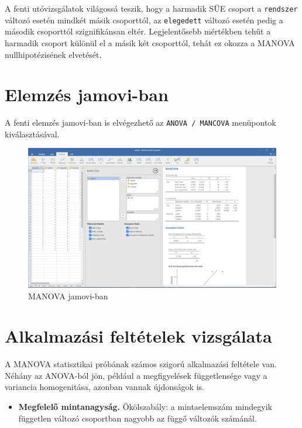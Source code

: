 \documentclass[
  letterpaper,
]{krantz}
\providecommand{\tightlist}{%
  \setlength{\itemsep}{0pt}\setlength{\parskip}{0pt}}\usepackage{longtable,booktabs,array}
\begin{document}
A fenti utóvizsgálatok világossá teszik, hogy a harmadik SÜE csoport a
\texttt{rendszer} változó esetén mindkét másik csoporttól, az
\texttt{elegedett} változó esetén pedig a második csoporttól
szignifikánsan eltér. Legjelentősebb mértékben tehűt a harmadik csoport
különül el a másik két csoporttól, tehát ez okozza a MANOVA
nullhipotézisének elvetését.

\hypertarget{elemzuxe9s-jamovi-ban}{%
\section{Elemzés jamovi-ban}\label{elemzuxe9s-jamovi-ban}}

A fenti elemzés jamovi-ban is elvégezhető az \texttt{ANOVA\ /\ MANCOVA}
menüpontok kiválasztásával.

\begin{figure}

{\centering \includegraphics{./images/manova_kep_01.jpg}

}

\caption{MANOVA jamovi-ban}

\end{figure}

\hypertarget{alkalmazuxe1si-feltuxe9telek-vizsguxe1lata}{%
\section{Alkalmazási feltételek
vizsgálata}\label{alkalmazuxe1si-feltuxe9telek-vizsguxe1lata}}

A MANOVA statisztikai próbának számos szigorú alkalmazási feltétele van.
Néhány az ANOVA-ból jön, például a megfigyelések függetlensége vagy a
variancia homogenitása, azonban vannak újdonságok is.

\begin{itemize}
\tightlist
\item
  \textbf{Megfelelő mintanagyság.} Ökölszabály: a mintaelemszám
  mindegyik független változó csoportban nagyobb az függő változók
  számánál.
\end{itemize}
\end{document}
